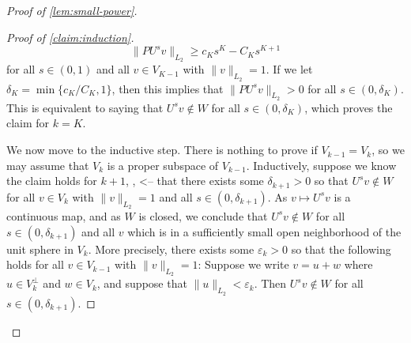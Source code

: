 \documentclass{toc}
\theoremstyle{plain}
\numberwithin{equation}{section}
\theoremstyle{definition}
\newcommand{\norm}[1]{\lVert#1\rVert}
\begin{document}
\begin{proof}[Proof of \cref{lem:small-power}]
\begin{proof}[Proof of \cref{claim:induction}]
         \[
            \norm{PU^s v}_{L_2} \geq c_K s^K - C_K s^{K+1}
        \]
        for all $s \in (0,1)$ and all $v \in V_{K-1}$ with $\norm v_{L_2}=1$. If we let $\delta_K=\min\{c_K/C_K,1\}$, then this implies that $\norm{PU^sv}_{L_2}>0$ for all $s \in (0,\delta_K)$. This is equivalent to saying that $U^s v \notin W$ for all $s \in (0,\delta_K)$, which proves the claim for $k=K$.

        We now move to the inductive step. There is nothing to prove if $V_{k-1}=V_k$, so we may assume that $V_k$ is a proper subspace of $V_{k-1}$. Inductively, suppose we know the claim holds for $k+1$,
%
\ie,      <--
that there exists some $\delta_{k+1}>0$ so that $U^s v \notin W$ for all $v \in V_k$ with $\norm{v}_{L_2}=1$ and all $s \in (0,\delta_{k+1})$. As $v \mapsto U^s v$ is a continuous map, and as $W$ is closed, we conclude that $U^s v \notin W$ for all $s \in (0,\delta_{k+1})$ and all $v$ which is in a sufficiently small open neighborhood of the unit sphere in $V_k$. More precisely, there exists some $\varepsilon_k>0$ so that the following holds for all $v \in V_{k-1}$ with $\norm v_{L_2}=1$: Suppose we write $v=u+w$ where $u \in V_{k}^\perp$ and $w \in V_{k}$, and suppose that $\norm{u}_{L_2} <\varepsilon_k$. Then $U^s v \notin W$ for all $s \in (0,\delta_{k+1})$.


\end{proof}
\end{proof}
\end{document}
